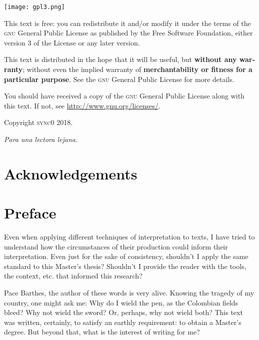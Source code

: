 \documentclass[paper=B6,portrait,twoside=true,twocolumn=false,headinclude=true,footinclude=false,fontsize=12,BCOR=10mm,DIV=calc,pagesize=auto,titlepage=firstiscover,mpinclude=false,headings=normal,headings=twolinechapter,open=right,toc=graduated,chapterprefix=false,numbers=endperiod,parskip=half+]{scrbook}
\theoremstyle{definition}
\begin{document}
\newpage
\vspace*{\fill}
\noindent
\texttt{[image: gpl3.png]}\par
\vspace{1\baselineskip}
\begin{english}
This text is free: you can redistribute it and/or modify it
under the terms of the \textsc{gnu} General Public License as published by
the Free Software Foundation, either version 3 of the License or any later
version.

This text is distributed in the hope that it will be useful, but \textbf{without
any warranty}; without even the implied warranty of \textbf{merchantability or 
fitness for a particular purpose}. See the \textsc{gnu} General 
Public License for more details.

You should have received a copy of the \textsc{gnu} General Public License along
with this text. If not, see \url{http://www.gnu.org/licenses/}.

\vspace{1\baselineskip}
\noindent
Copyright \textcopyright \textsc{sync0} 2018. 
\end{english}

\newpage 

\begin{FlushRight}
\begin{spanish}
\textit{Para una lectora lejana.}
\end{spanish}
\end{FlushRight}

\newpage
\tableofcontents 

\frontmatter
\pagestyle{plain}
\chapter{Acknowledgements} 

\lipsum

\chapter{Preface} 

Even when applying different techniques of interpretation to texts, I have
tried to understand how the circumstances of their production could inform
their interpretation. Even just for the sake of consistency, shouldn't I
apply the same standard to this Master's thesis? Shouldn't I provide the
reader with the tools, the context, etc. that informed this research?

Pace Barthes, the author of these words is very alive. Knowing the tragedy
of my country, one might ask me: Why do I wield the pen, as the Colombian
fields bleed? Why not wield the sword? Or, perhaps, why not wield both?
This text was written, certainly, to satisfy an earthly requirement: to
obtain a Master's degree. But beyond that, what is the interest of writing
for me?
\end{document}
